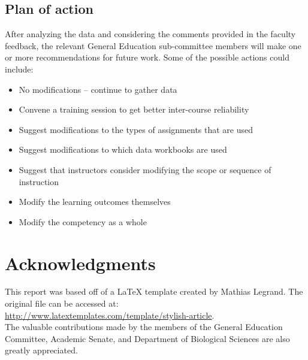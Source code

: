 \documentclass[fleqn,10pt]{SelfArx}\usepackage[]{graphicx}\usepackage[]{color}
\begin{document}
\subsection{Plan of action}
After analyzing the data and considering the comments provided in the faculty feedback, the relevant General Education sub-committee members will make one or more recommendations for future work. Some of the possible actions could include:
\begin{itemize}[noitemsep] %
\item No modifications -- continue to gather data
\item Convene a training session to get better inter-course reliability
\item Suggest modifications to the types of assignments that are used
\item Suggest modifications to which data workbooks are used
\item Suggest that instructors consider modifying the scope or sequence of instruction
\item Modify the learning outcomes themselves
\item Modify the competency as a whole
\end{itemize}

\section*{Acknowledgments} %

This report was based off of a \LaTeX{} template created by Mathias Legrand. The original file can be accessed at: \\
\href{http://www.latextemplates.com/template/stylish-article}{http://www.latextemplates.com/template/stylish-article}. \\
The valuable contributions made by the members of the General Education Committee, Academic Senate, and Department of Biological Sciences are also greatly appreciated.

\printbibliography[title={References},heading=bibintoc]


\end{document}

